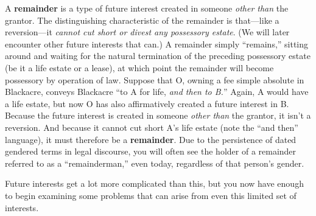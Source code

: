 A \textbf{remainder} is a type of future interest created in someone
\textit{other than} the grantor. The distinguishing characteristic of the
remainder is that---like a reversion---it \textit{cannot cut short or divest
any possessory estate}. (We will later encounter other future
interests that can.) A remainder simply ``remains,'' sitting around and waiting
for the natural termination of the preceding possessory estate (be it a life
estate or a lease), at which point the remainder will become possessory by
operation of law. Suppose that O, owning a fee simple absolute in Blackacre,
conveys Blackacre ``to A for life, \textit{and then to B.}'' Again, A would
have a life estate, but now O has also affirmatively created a future interest
in B. Because the future interest is created in someone \textit{other than} the
grantor, it isn't a reversion. And because it cannot cut short A's life estate
(note the ``and then'' language), it must therefore be a
\textbf{remainder}. Due to the persistence of dated gendered terms in
legal discourse, you will often see the holder of a remainder referred to as a
``remainderman,'' even today, regardless of that person's gender.

Future interests get a lot more complicated than this, but you now have enough
to begin examining some problems that can arise from even this limited set of
interests.

